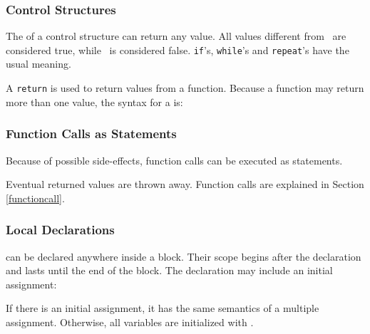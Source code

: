 \subsubsection{Control Structures}
The  of a control structure can return any value.
All values different from \nil\ are considered true,
while \nil\ is considered false.
{\tt if}'s, {\tt while}'s and {\tt repeat}'s have the usual meaning.

\begin{Produc}
\end{Produc}

A {\tt return} is used to return values from a function. \label{return}
Because a function may return more than one value,
the syntax for a  is:
\begin{Produc}
\end{Produc}

\subsubsection{Function Calls as Statements} \label{funcstat}
Because of possible side-effects,
function calls can be executed as statements.
\begin{Produc}
\end{Produc}%
Eventual returned values are thrown away.
Function calls are explained in Section \ref{functioncall}.

\subsubsection{Local Declarations} \label{localvar}
 can be declared anywhere inside a block.
Their scope begins after the declaration and lasts until the
end of the block.
The declaration may include an initial assignment:
\begin{Produc}
\end{Produc}%
If there is an initial assignment, it has the same semantics
of a multiple assignment.
Otherwise, all variables are initialized with \nil.


